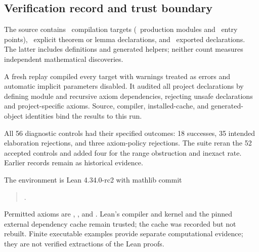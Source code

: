 \subsection{Verification record and trust boundary}
The source contains \EditionTargets\ compilation targets (\EditionProductionModules\ production modules and \EditionRoots\ entry points), \EditionTheorems\ explicit theorem or lemma declarations, and \EditionDeclarations\ exported declarations. The latter includes definitions and generated helpers; neither count measures independent mathematical discoveries.

A fresh replay compiled every target with warnings treated as errors and automatic implicit parameters disabled. It audited all project declarations by defining module and recursive axiom dependencies, rejecting unsafe declarations and project-specific axioms. Source, compiler, installed-cache, and generated-object identities bind the results to this run.

All 56 diagnostic controls had their specified outcomes: 18 successes, 35 intended elaboration rejections, and three axiom-policy rejections. The suite reran the 52 accepted controls and added four for the range obstruction and inexact rate. Earlier records remain as historical evidence.

The environment is Lean 4.34.0-rc2 with mathlib commit
\begin{quote}\small{}.\end{quote}
Permitted axioms are , , and . Lean's compiler and kernel and the pinned external dependency cache remain trusted; the cache was recorded but not rebuilt. Finite executable examples provide separate computational evidence; they are not verified extractions of the Lean proofs.

